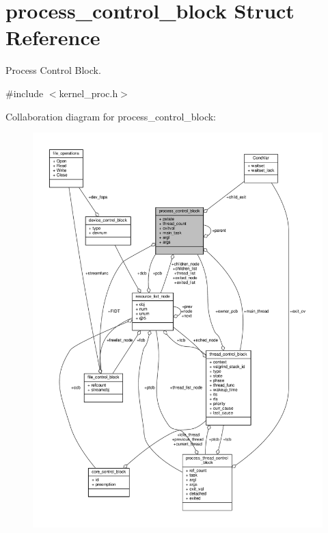 \hypertarget{structprocess__control__block}{}\section{process\+\_\+control\+\_\+block Struct Reference}
\label{structprocess__control__block}


Process Control Block.  




{\ttfamily \#include $<$kernel\+\_\+proc.\+h$>$}



Collaboration diagram for process\+\_\+control\+\_\+block\+:\nopagebreak
\begin{figure}[H]
\begin{center}
\leavevmode
\includegraphics[width=350pt]{structprocess__control__block__coll__graph}
\end{center}
\end{figure}
